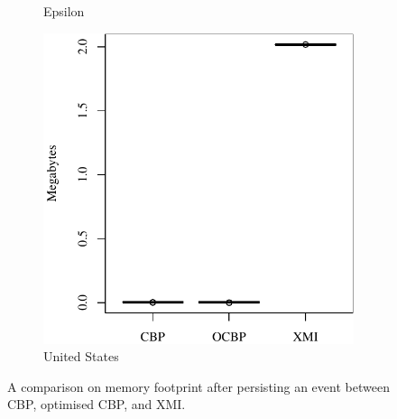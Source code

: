 \documentclass{llncs}
\begin{document}
\begin{figure}
\begin{subfigure}{0.325\textwidth}
            \caption{Epsilon}
            \label{fig:save_memory_epsilon}
        \end{subfigure}
        \hfill
        \begin{subfigure}{0.325\textwidth}
            \centering
            \includegraphics[width=\linewidth]{images/save_memory_wikipedia}
            \caption{United States}
            \label{fig:save_memory_wikipedia}
        \end{subfigure}
        \caption{A comparison on memory footprint after persisting an event between CBP, optimised CBP, and XMI.}
        \label{fig:savememory}
    \end{figure}
    
\end{document}
